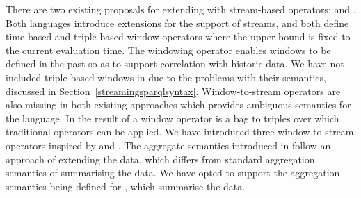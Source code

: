 There are two existing proposals for extending \sparql with stream-based operators: \streamingsparql \cite{Bolles_08} and \csparql \cite{Barbieri2010An-Execution-En}.
Both languages introduce extensions for the support of \rdf streams, and both define time-based and triple-based window operators where the upper bound is fixed to the current evaluation time.
The \sparqlstr windowing operator enables windows to be defined in the past so as to support correlation with historic data. 
We have not included triple-based windows in \sparqlstr due to the problems with their semantics, discussed in Section~\ref{streamingsparqlsyntax}.
Window-to-stream operators are also missing in both existing approaches which provides ambiguous semantics for the language.
In \sparqlstr the result of a window operator is a bag to triples over which traditional operators can be applied.
We have introduced three window-to-stream operators inspired by \sneeql and \cql.
The aggregate semantics introduced in \csparql follow an approach of extending the data, which differs from standard aggregation semantics of summarising the data.
We have opted to support the aggregation semantics being defined for  \cite{Harris2010SPARQL-1.1-Quer}, which summarise the data.


